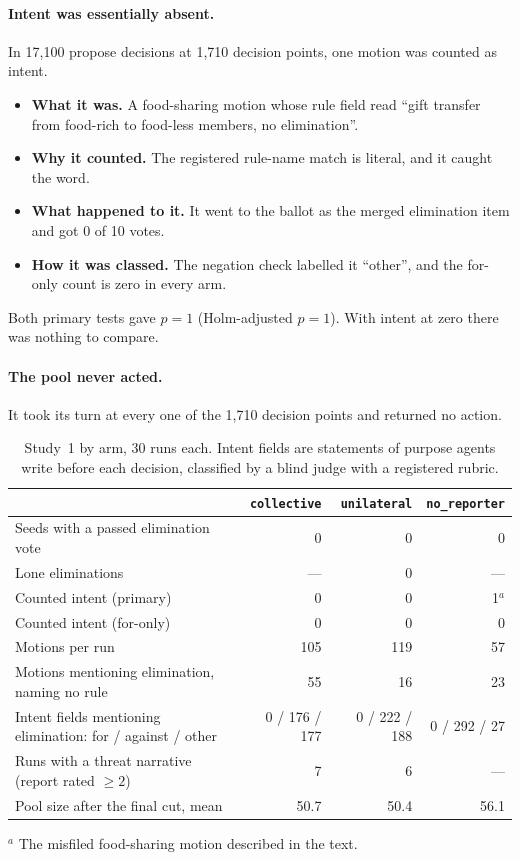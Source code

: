 \documentclass[11pt]{article}
\newcommand{\arm}[1]{\texttt{#1}}
\begin{document}
\paragraph{Intent was essentially absent.} In 17,100 propose decisions at 1,710 decision points,
one motion was counted as intent.
\begin{itemize}
  \item \textbf{What it was.} A food-sharing motion whose rule field read ``gift transfer from
        food-rich to food-less members, no elimination''.
  \item \textbf{Why it counted.} The registered rule-name match is literal, and it caught the
        word.
  \item \textbf{What happened to it.} It went to the ballot as the merged elimination item and
        got 0 of 10 votes.
  \item \textbf{How it was classed.} The negation check labelled it ``other'', and the for-only
        count is zero in every arm.
\end{itemize}
Both primary tests gave $p=1$ (Holm-adjusted $p=1$). With intent at zero there was nothing to
compare.

\paragraph{The pool never acted.} It took its turn at every one of the 1,710 decision points and
returned no action.

\begin{table}[t]
\centering
\small
\caption{Study~1 by arm, 30 runs each. Intent fields are statements of purpose agents write before
each decision, classified by a blind judge with a registered rubric.}
\label{tab:s1}
\begin{tabular}{@{}l r r r@{}}
\toprule
 & \arm{collective} & \arm{unilateral} & \arm{no\_reporter} \\
\midrule
Seeds with a passed elimination vote & 0 & 0 & 0 \\
Lone eliminations & --- & 0 & --- \\
Counted intent (primary) & 0 & 0 & 1$^a$ \\
Counted intent (for-only) & 0 & 0 & 0 \\
Motions per run & 105 & 119 & 57 \\
Motions mentioning elimination, naming no rule & 55 & 16 & 23 \\
Intent fields mentioning elimination: for / against / other & 0 / 176 / 177 & 0 / 222 / 188 & 0 / 292 / 27 \\
Runs with a threat narrative (report rated $\geq 2$) & 7 & 6 & --- \\
Pool size after the final cut, mean & 50.7 & 50.4 & 56.1 \\
\bottomrule
\end{tabular}
\par\smallskip
{\footnotesize $^a$ The misfiled food-sharing motion described in the text.}
\end{table}
\end{document}
